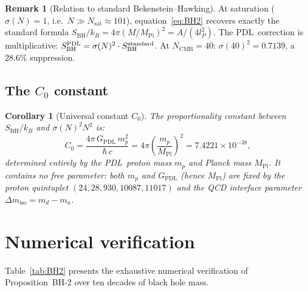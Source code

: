 \documentclass[11pt,a4paper]{article}
\newtheorem{corollary}[theorem]{Corollary}
\theoremstyle{definition}
\newtheorem{remark}[theorem]{Remark}
\newcommand{\PDL}{\textnormal{PDL}}
\newcommand{\sig}{\sigma}
\newcommand{\GPDL}{G_{\mathrm{PDL}}}
\newcommand{\hb}{\hbar}
\newcommand{\SBH}{S_{\mathrm{BH}}}
\newcommand{\MPl}{M_{\mathrm{Pl}}}
\newcommand{\lP}{l_P}
\begin{document}
\begin{remark}[Relation to standard Bekenstein--Hawking]
\label{rem:standard}
At saturation ($\sig(N) = 1$, i.e.\ $N \gg N_\mathrm{sat} \approx 101$),
equation~\eqref{eq:BH2} recovers exactly the standard formula
$\SBH/k_B = 4\pi(M/\MPl)^2 = A/(4\lP^2)$. The \PDL\ correction is
multiplicative: $\SBH^\PDL = \sig(N)^2\cdot\SBH^\mathrm{standard}$.
At $N_\mathrm{CMB} = 40$: $\sig(40)^2 = 0.7139$, a $28.6\%$ suppression.
\end{remark}

\subsection{The \texorpdfstring{$C_0$}{C0} constant}

\begin{corollary}[Universal constant $C_0$]
\label{cor:C0}
The proportionality constant between $\SBH/k_B$ and $\sig(N)^2 N^2$ is:
\begin{equation}
C_0 = \frac{4\pi\,\GPDL\,m_p^2}{\hb\,c}
= 4\pi\left(\frac{m_p}{\MPl}\right)^2
= 7.4221\times10^{-38},
\label{eq:C0}
\end{equation}
determined entirely by the \PDL\ proton mass $m_p$ and Planck mass $\MPl$.
It contains no free parameter: both $m_p$ and $\GPDL$ (hence $\MPl$) are
fixed by the proton quintuplet $(24,28,930,10087,11017)$ and the QCD
interface parameter $\Delta m_\mathrm{iso} = m_d - m_u$.
\end{corollary}

\section{Numerical verification}
\label{sec:numerics}

Table~\ref{tab:BH2} presents the exhaustive numerical verification of
Proposition~BH-2 over ten decades of black hole mass.
\end{document}
